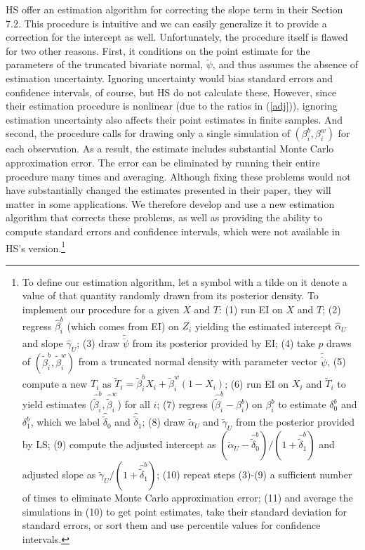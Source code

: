 \documentclass[11pt,titlepage]{article}
\newcommand{\psiu}{\breve{\psi}}
\begin{document}
HS offer an estimation algorithm for correcting the slope term in
their Section 7.2.  This procedure is intuitive and we can easily
generalize it to provide a correction for the intercept as well.
Unfortunately, the procedure itself is flawed for two other reasons.
First, it conditions on the point estimate for the parameters of the
truncated bivariate normal, $\breve\psi$, and thus assumes the absence
of estimation uncertainty.  Ignoring uncertainty would bias standard
errors and confidence intervals, of course, but HS do not calculate
these.  However, since their estimation procedure is nonlinear (due to
the ratios in (\ref{adj})), ignoring estimation uncertainty also
affects their point estimates in finite samples.  And second, the
procedure calls for drawing only a single simulation of
$(\beta_i^b,\beta_i^w)$ for each observation.  As a result, the
estimate includes substantial Monte Carlo approximation error.  The
error can be eliminated by running their entire procedure many times
and averaging.  Although fixing these problems would not have
substantially changed the estimates presented in their paper, they
will matter in some applications.  We therefore develop and use a new
estimation algorithm that corrects these problems, as well as
providing the ability to compute standard errors and confidence
intervals, which were not available in HS's version.\footnote{To
  define our estimation algorithm, let a symbol with a tilde on it
  denote a value of that quantity randomly drawn from its posterior
  density.  To implement our procedure for a given $X$ and $T$: (1)
  run EI on $X$ and $T$; (2) regress $\hat\beta_i^b$ (which comes from
  EI) on $Z_i$ yielding the estimated intercept $\hat\alpha_U$ and
  slope $\hat\gamma_U$; (3) draw $\tilde\psiu$ from its posterior
  provided by EI; (4) take $p$ draws of
  $(\tilde\beta_i^b,\tilde\beta_i^w)$ from a truncated normal density
  with parameter vector $\tilde\psiu$, (5) compute a new $T_i$ as
  $\tilde T_i=\tilde\beta_i^bX_i+\tilde\beta_i^w(1-X_i)$; (6) run EI
  on $X_i$ and $\tilde T_i$ to yield estimates
  ($\hat\tilde\beta_i^b,\hat\tilde\beta_i^w$) for all $i$; (7) regress
  ($\hat\tilde\beta_i^b-\beta_i^b$) on $\beta_i^b$ to estimate
  $\delta_0^b$ and $\delta_1^b$, which we label $\hat\tilde\delta_0$
  and $\hat\tilde\delta_1$; (8) draw $\tilde\alpha_U$ and
  $\tilde\gamma_U$ from the posterior provided by LS; (9) compute the
  adjusted intercept as
  $(\tilde\alpha_U-\hat\tilde\delta_0^b)/(1+\hat\tilde\delta_1^b)$ and
  adjusted slope as $\tilde\gamma_U/(1+\hat\tilde\delta_1^b)$; (10)
  repeat steps (3)-(9) a sufficient number of times to eliminate Monte
  Carlo approximation error; (11) and average the simulations in (10)
  to get point estimates, take their standard deviation for standard
  errors, or sort them and use percentile values for confidence
  intervals.}
\end{document}
